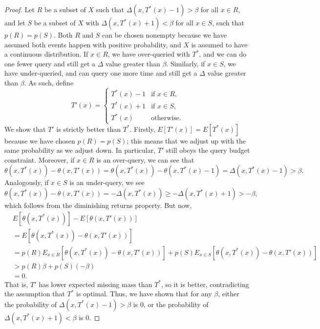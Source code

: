 \documentclass{scrartcl}
\begin{document}
\begin{proof}
Let $R$ be a subset of $X$ such that $\Delta(x, T^*(x) - 1) > \beta$ for all $x \in R$,
and let $S$ be a subset of $X$ with $\Delta(x, T^*(x) + 1) < \beta$ for all $x \in S$, such that $p(R) = p(S)$.
Both $R$ and $S$ can be chosen nonempty because we have assumed both events happen with positive probability,
and $X$ is assumed to have a continuous distribution. If $x \in R$, we have over-queried with $T^*$, and we can do one fewer query and still get a $\Delta$ value greater than $\beta$.
Similarly, if $x \in S$, we have under-queried, and can query one more time and still get a $\Delta$ value greater than $\beta$. As such, define
\[ T'(x) = \begin{cases*}
        T^*(x) - 1 & \text{if $x \in R$,} \\
        T^*(x) + 1 & \text{if $x \in S$,} \\
        T^*(x) & \text{otherwise.}
    \end{cases*}
\]
We show that $T'$ is strictly better than $T^*$. Firstly, $E[T'(x)] = E[T^*(x)]$
because we have chosen $p(R) = p(S)$; this means that we adjust up with the same probability as we adjust down.
In particular, $T'$ still obeys the query budget constraint. Moreover, if $x \in R$ is an over-query, we can see that
\[ \theta(x, T^*(x)) - \theta(x, T'(x)) = \theta(x, T^*(x)) - \theta(x, T^*(x) - 1) = \Delta(x, T^*(x) - 1) > \beta . \]
Analogously, if $x \in S$ is an under-query, we see
\[ \theta(x, T^*(x)) - \theta(x, T'(x)) = -\Delta(x, T^*(x)) \ge -\Delta(x, T^*(x) + 1) > -\beta , \]
which follows from the diminishing returns property. But now,
\begin{align*}
&E[\theta(x, T^*(x))] - E[\theta(x, T'(x))] \\
&= E[\theta(x, T^*(x)) - \theta(x, T'(x))] \\
&= p(R)E_{x \in R}[\theta(x, T^*(x)) - \theta(x, T'(x))] + p(S)E_{x \in S}[\theta(x, T^*(x)) - \theta(x, T'(x))] \\
&> p(R)\beta + p(S)(-\beta) \\
&= 0 .
\end{align*}
That is, $T'$ has lower expected missing mass than $T^*$, so it is better, contradicting the assumption that $T^*$ is optimal.
Thus, we have shown that for any $\beta$, either the probability of $\Delta(x, T^*(x) - 1) > \beta$ is $0$, or the probability of $\Delta(x, T^*(x) + 1) < \beta$ is $0$.
\end{proof}

\printbibliography
\end{document}
